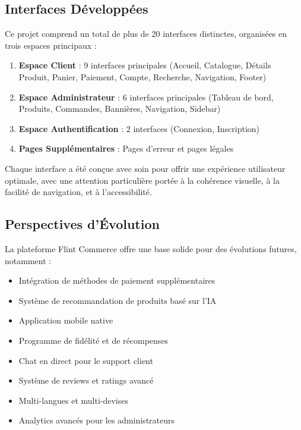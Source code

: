 \documentclass[12pt,a4paper]{article}
\begin{document}
\subsection{Interfaces Développées}

Ce projet comprend un total de plus de 20 interfaces distinctes, organisées en trois espaces principaux :

\begin{enumerate}
    \item \textbf{Espace Client} : 9 interfaces principales (Accueil, Catalogue, Détails Produit, Panier, Paiement, Compte, Recherche, Navigation, Footer)
    
    \item \textbf{Espace Administrateur} : 6 interfaces principales (Tableau de bord, Produits, Commandes, Bannières, Navigation, Sidebar)
    
    \item \textbf{Espace Authentification} : 2 interfaces (Connexion, Inscription)
    
    \item \textbf{Pages Supplémentaires} : Pages d'erreur et pages légales
\end{enumerate}

Chaque interface a été conçue avec soin pour offrir une expérience utilisateur optimale, avec une attention particulière portée à la cohérence visuelle, à la facilité de navigation, et à l'accessibilité.

\subsection{Perspectives d'Évolution}

La plateforme Flint Commerce offre une base solide pour des évolutions futures, notamment :

\begin{itemize}
    \item Intégration de méthodes de paiement supplémentaires
    \item Système de recommandation de produits basé sur l'IA
    \item Application mobile native
    \item Programme de fidélité et de récompenses
    \item Chat en direct pour le support client
    \item Système de reviews et ratings avancé
    \item Multi-langues et multi-devises
    \item Analytics avancés pour les administrateurs
\end{itemize}
\end{document}
